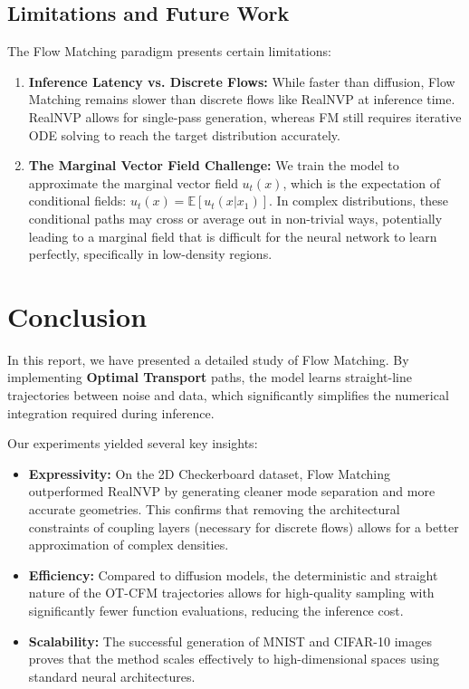 \documentclass{article}
\begin{document}
\subsection{Limitations and Future Work}
The Flow Matching paradigm presents certain limitations:
\begin{enumerate}
    \item \textbf{Inference Latency vs. Discrete Flows:} While faster than diffusion, Flow Matching remains slower than discrete flows like RealNVP at inference time. RealNVP allows for single-pass generation, whereas FM still requires iterative ODE solving to reach the target distribution accurately.
    \item \textbf{The Marginal Vector Field Challenge:} We train the model to approximate the marginal vector field $u_t(x)$, which is the expectation of conditional fields: $u_t(x) = \mathbb{E}[u_t(x|x_1)]$. In complex distributions, these conditional paths may cross or average out in non-trivial ways, potentially leading to a marginal field that is difficult for the neural network to learn perfectly, specifically in low-density regions.
\end{enumerate}

\section{Conclusion}
\label{sec:conclusion}

In this report, we have presented a detailed study of Flow Matching. By implementing \textbf{Optimal Transport} paths, the model learns straight-line trajectories between noise and data, which significantly simplifies the numerical integration required during inference.

Our experiments yielded several key insights:
\begin{itemize}
    \item \textbf{Expressivity:} On the 2D Checkerboard dataset, Flow Matching outperformed RealNVP by generating cleaner mode separation and more accurate geometries. This confirms that removing the architectural constraints of coupling layers (necessary for discrete flows) allows for a better approximation of complex densities.
    \item \textbf{Efficiency:} Compared to diffusion models, the deterministic and straight nature of the OT-CFM trajectories allows for high-quality sampling with significantly fewer function evaluations, reducing the inference cost.
    \item \textbf{Scalability:} The successful generation of MNIST and CIFAR-10 images proves that the method scales effectively to high-dimensional spaces using standard neural architectures.
\end{itemize}
\end{document}
